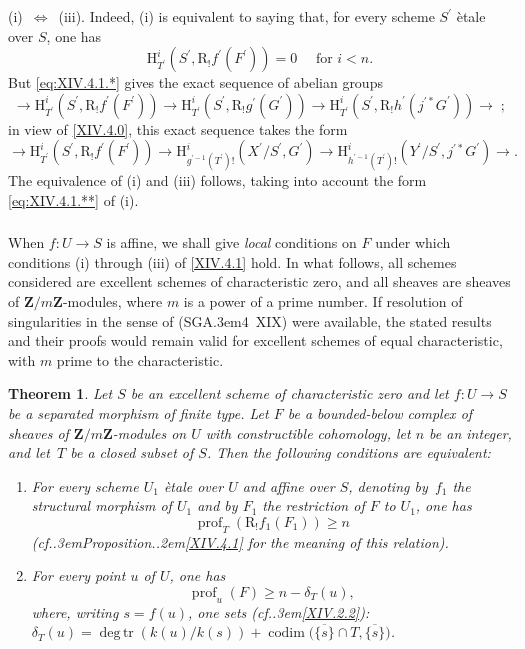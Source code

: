 \documentclass[11pt,a4paper,oneside]{book}
\providecommand{\sisi}[2]{#2}
\providecommand{\pageoriginale}{%
  \refstepcounter{pageoriginal}%
  \marginpar{\raggedright\footnotesize\bfseries\thepageoriginal}%
  \xspace}
\providecommand{\cf}{cf.\kern.3em}
\providecommand{\SGA}{\textup{SGA}\kern.3em}
\providecommand{\ptbl}{.\kern.2em}
\providecommand{\ZZ}{\mathbf Z}
\DeclareMathOperator{\degtr}{deg\,tr}
\providecommand{\prof}{\operatorname{prof}}
\providecommand{\codim}{\operatorname{codim}}
\renewcommand{\H}{\mathrm H}
\providecommand{\R}{\mathrm R}
\providecommand{\SSI}{\unskip~$\Longleftrightarrow$~\ignorespaces}
\newenvironment{enumeratei}
  {\begin{enumerate}[label=(\roman*)]}
  {\end{enumerate}}
\theoremstyle{plain}
\newtheorem{theoreme}[subsection]{Theorem}
\theoremstyle{definition}
\theoremstyle{remark}
\renewcommand{\Ref}[1]{\textup{\ref{#1}}}
\begin{document}
\textup{(i)}\SSI\textup{(iii)}. Indeed, \textup{(i)} is equivalent to saying that, for every scheme $S^{\prime}$ \`etale over $S$, one has
\begin{equation*} \label{eq:XIV.4.1.**} \tag{$**$} {\H_{T^{\prime}}^{i}(S^{\prime}, \R_{!}f^{\prime}(F^{\prime}))=0\quad\textrm{ for }i<n.}
\end{equation*}
But \eqref{eq:XIV.4.1.*} gives the exact sequence of abelian groups
$$
\to\H_{T^{\prime}}^{i}(S^{\prime}, \R_{!}f^{\prime}(F^{\prime}))\to\H_{T^{\prime}}^{i}(S^{\prime}, \R_{!}g^{\prime}(G^{\prime}))\to \H_{T^{\prime}}^{i}(S^{\prime}, \R_{!}h^{\prime}(j^{\prime\ast}G^{\prime}))\to\;;$$
in view of \Ref{XIV.4.0}, this exact sequence takes the form
$$
\to\H_{T^{\prime}}^{i}(S^{\prime}, \R_{!}f^{\prime}(F^{\prime}))\to\H_{g^{\prime -1}(T^{\prime})!}^{i}(X^{\prime}/S^{\prime}, G^{\prime})\to\H_{h^{\prime -1}(T^{\prime})!}^{i}(Y^{\prime}/S^{\prime}, j^{\prime\ast}G^{\prime})\sisi{}{\to.}$$
The equivalence of \textup{(i)} and \textup{(iii)} follows, taking into account the form \eqref{eq:XIV.4.1.**} of \textup{(i)}.

\setcounter{subsubsection}{-1} \setcounter{subsection}{2}

\subsubsection{} \label{XIV.4.2.0}
When $f\colon U\to S$ is affine, we shall give \emph{local} conditions on $F$ under which conditions \textup{(i)} through \textup{(iii)} of \Ref{XIV.4.1} hold. In what follows, all schemes considered are excellent schemes of characteristic zero, and all sheaves are sheaves of $\ZZ/m\ZZ$-modules, where $m$ is a power of a prime number. If resolution of singularities in the sense of (\SGA 4~XIX) were available, the stated results and their proofs would remain valid for excellent schemes of equal characteristic, with $m$ prime to the characteristic.

\setcounter{subsection}{1}

\begin{theoreme} \label{XIV.4.2}
Let\pageoriginale $S$ be an excellent scheme of characteristic zero and let \hbox{$f\colon U\!\to\! S$} be a separated morphism of finite type. Let $F$ be a bounded-below complex of sheaves of $\ZZ/m\ZZ$-modules on $U$ with constructible cohomology, let $n$ be an integer, and let~$T$ be a closed subset of $S$. Then the following conditions are equivalent:
\begin{enumeratei}
\item
For every scheme $U_{1}$ \`etale over $U$ and affine over $S$, denoting by~$f_{1}$ the structural morphism of $U_{1}$ and by $F_{1}$ the restriction of $F\sisi{_{1}}{}$ to $U_{1}$, one has
$$
\prof_{T}(\R_{!}f_{1}(F_{1}))\geq n$$
(\cf Proposition\ptbl \Ref{XIV.4.1} for the meaning of this relation).
\item
For every point $u$ of $U$, one has
$$
\prof_{u}(F)\geq n-\delta_{T}(u),
$$
where, writing $s=f(u)$, one sets (\cf \Ref{XIV.2.2}): $\delta_{T}(u)=\degtr(k(u)/k(s))+\codim\big(\overline{\{ s\} }\cap T, \overline{\{ s\} } \big)$.
\end{enumeratei}
\end{theoreme}
\end{document}

